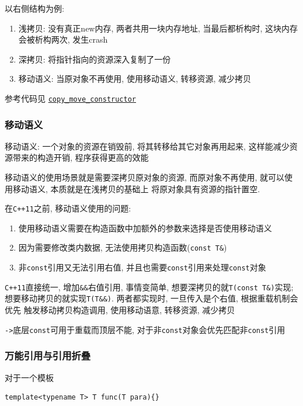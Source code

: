 以右侧结构为例: 



\begin{enumerate}
	\item 浅拷贝: 没有真正new内存, 两者共用一块内存地址, 当最后都析构时, 这块内存会被析构两次, 发生crash
	\item 深拷贝: 将指针指向的资源深入复制了一份
	\item 移动语义: 当原对象不再使用, 使用移动语义, 转移资源, 减少拷贝
\end{enumerate}
参考代码见 \href{https://github.com/wenqingqian/Obtuse/blob/main/test/cpp/c++11/copy_move_constructor}{\tt copy\_move\_constructor}
\subsubsection{移动语义}
移动语义: 一个对象的资源在销毁前, 将其转移给其它对象再用起来, 这样能减少资源带来的构造开销, 程序获得更高的效能

移动语义的使用场景就是需要深拷贝原对象的资源, 而原对象不再使用, 就可以使用移动语义, 本质就是在浅拷贝的基础上
	将原对象具有资源的指针置空.

在{\tt C++11}之前, 移动语义使用的问题:
\begin{enumerate}
	\item 使用移动语义需要在构造函数中加额外的参数来选择是否使用移动语义
	\item 因为需要修改类内数据, 无法使用拷贝构造函数({\tt const T\&})
	\item 非{\tt const}引用又无法引用右值, 并且也需要{\tt const}引用来处理{\tt const}对象
\end{enumerate}

{\tt C++11}直接统一, 增加{\tt \&\&}右值引用, 事情变简单, 想要深拷贝的就{\tt T(const T\&)}实现;
	想要移动拷贝的就实现{\tt T(T\&\&)}. 两者都实现时, 一旦传入是个右值, 根据重载机制会优先
	触发移动拷贝构造调用, 使用移动语意, 转移资源, 减少拷贝

{\tt ->}\quad 底层{\tt const}可用于重载而顶层不能, 对于非{\tt const}对象会优先匹配非{\tt const}引用
\subsubsection{万能引用与引用折叠}

对于一个模板
\begin{lstlisting}[xleftmargin=10em,xrightmargin=10em]
template<typename T> T func(T para){}
\end{lstlisting}

